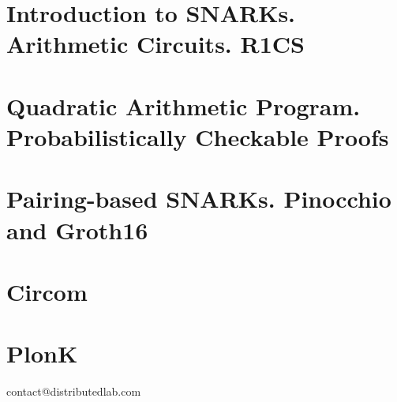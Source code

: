 \documentclass{zkdl-template-105x135-nohead}
\begin{document}
    

    \section[Arithmetic Circuits. R1CS]{Introduction to SNARKs. Arithmetic Circuits. R1CS} \label{section:r1cs}

    \label{secation:circuits}

    \section[Quadratic Arithmetic Program]{Quadratic Arithmetic Program. Probabilistically Checkable Proofs} \label{section:qap}

    

    \section[Pairing-based SNARKs]{Pairing-based SNARKs. Pinocchio and Groth16} \label{section:groth16}

    

    \section{Circom} \label{section:circom}

     

    \section{PlonK} \label{section:plonk}

    


    \newpage
    \pagestyle{empty}
    
    \ifodd\value{page}
        \newpage
    \fi
    
    \vspace*{\fill}
    
    \begin{center}
        contact@distributedlab.com
    \end{center}
    
    \vspace*{\fill}
\end{document}
